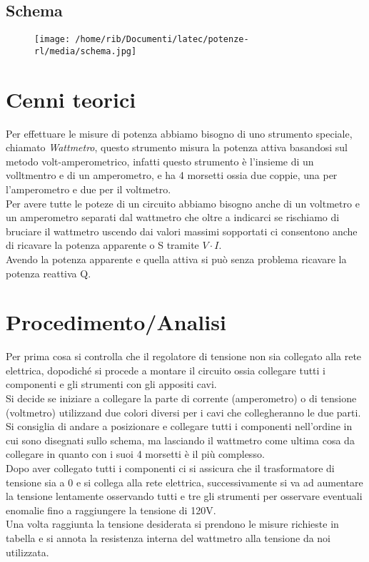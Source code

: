 \documentclass[12pt]{article}
\begin{document}
    \subsection{Schema}
    \begin{figure}[!h]
        \centering
        \texttt{[image: /home/rib/Documenti/latec/potenze-rl/media/schema.jpg]}
    \end{figure}
    \FloatBarrier
    
\section{Cenni teorici}
Per effettuare le misure di potenza abbiamo bisogno di uno strumento speciale, chiamato \textit{Wattmetro}, questo strumento misura
la potenza attiva basandosi sul metodo volt-amperometrico, infatti questo strumento è l'insieme di un volltmentro e di un amperometro, e ha 
4 morsetti ossia due coppie, una per l'amperometro e due per il voltmetro.\\
Per avere tutte le poteze di un circuito abbiamo bisogno anche di un voltmetro e un amperometro separati dal wattmetro che oltre a indicarci se 
rischiamo di bruciare il wattmetro uscendo dai valori massimi sopportati ci consentono anche di ricavare la potenza apparente o S tramite $V \cdot I$.\\
Avendo la potenza apparente e quella attiva si può senza problema ricavare la potenza reattiva Q.

\section{Procedimento/Analisi}
Per prima cosa si controlla che il regolatore di tensione non sia collegato alla rete elettrica, dopodiché si procede a montare il 
circuito ossia collegare tutti i componenti e gli strumenti con gli appositi cavi.\\
Si decide se iniziare a collegare la parte di corrente (amperometro) o di tensione (voltmetro) utilizzand due colori diversi per i cavi che collegheranno le due parti.\\
Si consiglia di andare a posizionare e collegare tutti i componenti nell'ordine in cui sono disegnati sullo schema, ma lasciando il wattmetro come ultima cosa da 
collegare in quanto con i suoi 4 morsetti è il più complesso.\\
Dopo aver collegato tutti i componenti ci si assicura che il trasformatore di tensione sia a 0 e si collega alla rete elettrica, successivamente
si va ad aumentare la tensione lentamente osservando tutti e tre gli strumenti per osservare eventuali enomalie fino a raggiungere la tensione di 120V.\\
Una volta raggiunta la tensione desiderata si prendono le misure richieste in tabella e si annota la resistenza interna del wattmetro alla tensione da noi 
utilizzata.\\ 
\end{document}
